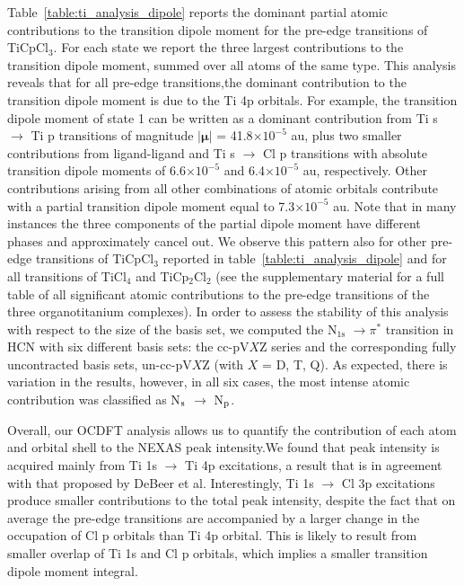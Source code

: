 \documentclass{article}
\begin{document}
Table~\ref{table:ti_analysis_dipole} reports the dominant partial atomic contributions to the transition dipole moment for the pre-edge transitions of TiCpCl$_3$.
For each state we report the three largest contributions to the transition dipole moment, summed over all atoms of the same type.
This analysis reveals that for all pre-edge transitions,the dominant contribution to the transition dipole moment is due to the Ti 4p orbitals.
For example, the transition dipole moment of state 1 can be written as a dominant contribution from Ti s $\rightarrow$ Ti p transitions of magnitude $|\boldsymbol\mu|$ = 41.8$\times 10^{-5}$  au, plus two smaller contributions from ligand-ligand and Ti s $\rightarrow$ Cl p transitions with absolute transition dipole moments of 6.6$\times 10^{-5}$ and 6.4$\times 10^{-5}$ au, respectively.
Other contributions arising from all other combinations of atomic orbitals contribute with a partial transition dipole moment equal to 7.3$\times 10^{-5}$ au.
Note that in many instances the three components of the partial dipole moment have different phases and approximately cancel out.
We observe this pattern also for other pre-edge transitions of TiCpCl$_3$ reported in table~\ref{table:ti_analysis_dipole} and for all transitions of TiCl$_4$ and TiCp$_2$Cl$_2$ (see the supplementary material for a full table of all significant atomic contributions to the pre-edge transitions of the three organotitanium complexes).
In order to assess the stability of this analysis with respect to the size of the basis set, we computed the N$_{1\text{s}}$ $\rightarrow \pi^*$ transition in HCN with six different basis sets: the cc-pV$X$Z series and the corresponding fully uncontracted basis sets, un-cc-pV$X$Z (with $X$ = D, T, Q). As expected, there is variation in the results, however, in all six cases, the most intense atomic contribution was classified as N$_{ \rm s}$ $\rightarrow$ N$_{\rm p}$.

Overall, our OCDFT analysis allows us to quantify the contribution of each atom and orbital shell to the NEXAS peak intensity.We found that peak intensity is acquired mainly from Ti 1s $\rightarrow$ Ti 4p excitations, a result that is in agreement with that proposed by DeBeer et al.\cite{TiCl4}
Interestingly, Ti 1s $\rightarrow$ Cl 3p excitations produce smaller contributions to the total peak intensity, despite the fact that on average the pre-edge transitions are accompanied by a larger change in the occupation of Cl p orbitals than Ti 4p orbital.
This is likely to result from smaller overlap of Ti 1s and Cl p orbitals, which implies a smaller transition dipole moment integral.
\end{document}
